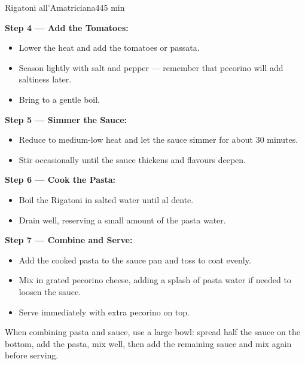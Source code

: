 \begin{recipebox}{Rigatoni all’Amatriciana}{4}{45 min}
\begin{method}
    \vspace{0.5em}

    \item \textbf{Step 4 — Add the Tomatoes:}
    \begin{itemize}[leftmargin=2em]
      \item Lower the heat and add the tomatoes or passata.
      \item Season lightly with salt and pepper — remember that pecorino will add saltiness later.
      \item Bring to a gentle boil.
    \end{itemize}

    \vspace{0.5em}

    \item \textbf{Step 5 — Simmer the Sauce:}
    \begin{itemize}[leftmargin=2em]
      \item Reduce to medium-low heat and let the sauce simmer for about 30 minutes.
      \item Stir occasionally until the sauce thickens and flavours deepen.
    \end{itemize}

    \vspace{0.5em}

    \item \textbf{Step 6 — Cook the Pasta:}
    \begin{itemize}[leftmargin=2em]
      \item Boil the Rigatoni in salted water until al dente.
      \item Drain well, reserving a small amount of the pasta water.
    \end{itemize}

    \vspace{0.5em}

    \item \textbf{Step 7 — Combine and Serve:}
    \begin{itemize}[leftmargin=2em]
      \item Add the cooked pasta to the sauce pan and toss to coat evenly.
      \item Mix in grated pecorino cheese, adding a splash of pasta water if needed to loosen the sauce.
      \item Serve immediately with extra pecorino on top.
    \end{itemize}

  \end{method}

  \begin{notes}
    When combining pasta and sauce, use a large bowl: spread half the sauce on the bottom, add the pasta, mix well, then add the remaining sauce and mix again before serving.
  \end{notes}

\end{recipebox}
